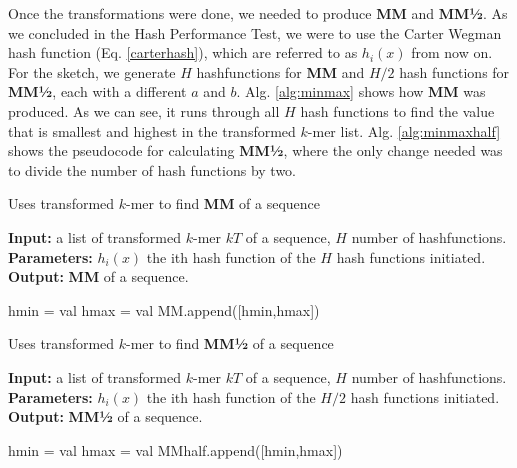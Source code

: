 \documentclass[../../main.tex]{subfiles}
\begin{document}
Once the transformations were done, we needed to produce {\bf MM} and {\bf MM½}. As we concluded in the Hash Performance Test, we were to use the Carter Wegman hash function (Eq. \ref{carterhash}), which are referred to as $h_i(x)$ from now on. For the sketch, we generate $H$ hashfunctions for {\bf MM} and $H/2$ hash functions for {\bf MM½}, each with a different $a$ and $b$. Alg. \ref{alg:minmax} shows how {\bf MM} was produced. As we can see, it runs through all $H$ hash functions to find the value that is smallest and highest in the transformed $k$-mer list. Alg. \ref{alg:minmaxhalf} shows the pseudocode for calculating {\bf MM½}, where the only change needed was to divide the number of hash functions by two.

\begin{algorithm}
\caption{Uses transformed $k$-mer to find {\bf MM} of a sequence}\label{alg:minmax}
\textbf{Input:} a list of transformed $k$-mer $kT$ of a sequence, $H$ number of hashfunctions.\\
\textbf{Parameters:} $h_i(x)$ the ith hash function of the $H$ hash functions initiated.\\
\textbf{Output:} {\bf MM} of a sequence.
\begin{algorithmic}[1]
\Statex
{}
				hmin = val
			\EndIf
				hmax = val
			\EndIf
		\EndFor
		\State MM.append([hmin,hmax])
	\EndFor
\State {}
\EndFunction
\end{algorithmic}
\end{algorithm}

\begin{algorithm}
\caption{Uses transformed $k$-mer to find {\bf MM½} of a sequence}\label{alg:minmaxhalf}
\textbf{Input:} a list of transformed $k$-mer $kT$ of a sequence, $H$ number of hashfunctions.\\
\textbf{Parameters:} $h_i(x)$ the ith hash function of the $H/2$ hash functions initiated.\\
\textbf{Output:} {\bf MM½} of a sequence.
\begin{algorithmic}[1]
\Statex
{}
				hmin = val
			\EndIf
				hmax = val
			\EndIf
		\EndFor
		\State MMhalf.append([hmin,hmax])
	\EndFor
\State {}
\EndFunction
\end{algorithmic}
\end{algorithm}
\end{document}
